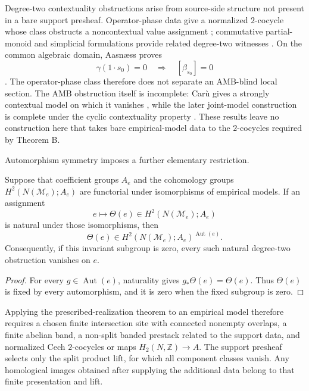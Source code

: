 Degree-two contextuality obstructions arise from source-side structure not
present in a bare support presheaf.  Operator-phase data give a normalized
\(2\)-cocycle whose class obstructs a noncontextual value assignment
\cite[Thm.~1]{OkayRobertsBartlettRaussendorf2017}; commutative partial-monoid
and simplicial formulations provide related degree-two witnesses
\cite[Secs.~3--4]{Aasnaess2022}\cite[Cor.~5.7]{OkayKharoofIpek2023}.  On the
common algebraic domain, Aasn{\ae}ss proves
\[
 \gamma(1\mathbin{\cdot}s_0)=0
 \quad\Longrightarrow\quad
 [\beta_{s_0}]=0
\]
\cite[Thm.~4.1]{Aasnaess2022}.  The operator-phase class therefore does not
separate an AMB-blind local section.  The AMB obstruction itself is
incomplete: Car\`u gives a strongly contextual model on which it vanishes
\cite[Sec.~4]{Caru2017}, while the later joint-model construction is complete
under the cyclic contextuality property \cite[Thm.~8.4]{Caru2018}.  These
results leave no construction here that takes bare empirical-model data to
the \(2\)-cocycles required by Theorem B.

Automorphism symmetry imposes a further elementary restriction.

\begin{proposition}
\label{prop:equivariant-no-selection}
Suppose that coefficient groups \(A_e\) and the cohomology groups
\(H^2(N(\mathcal M_e);A_e)\) are functorial under isomorphisms of empirical
models.  If an assignment
\[
 e\longmapsto
 \Theta(e)\in H^2(N(\mathcal M_e);A_e)
\]
is natural under those isomorphisms, then
\[
 \Theta(e)\in
 H^2(N(\mathcal M_e);A_e)^{\operatorname{Aut}(e)}.
\]
Consequently, if this invariant subgroup is zero, every such natural
degree-two obstruction vanishes on \(e\).
\end{proposition}

\begin{proof}
For every \(g\in\operatorname{Aut}(e)\), naturality gives
\(g_*\Theta(e)=\Theta(e)\).  Thus \(\Theta(e)\) is fixed by every
automorphism, and it is zero when the fixed subgroup is zero.
\end{proof}

Applying the prescribed-realization theorem to an empirical model therefore
requires a chosen finite intersection site with connected nonempty overlaps,
a finite abelian band, a non-split banded prestack related to the support
data, and normalized Cech \(2\)-cocycles or maps
\(H_2(N,\mathbb Z)\to A\).  The support presheaf selects only the split
product lift, for which all component classes vanish.  Any homological images
obtained after supplying the additional data belong to that finite
presentation and lift.
